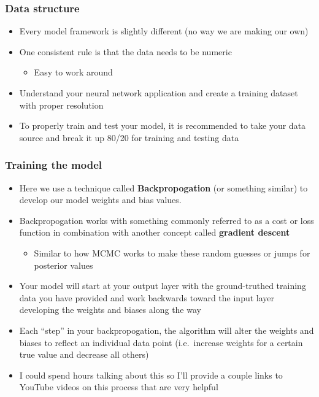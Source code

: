 \documentclass[
]{article}
\providecommand{\tightlist}{%
  \setlength{\itemsep}{0pt}\setlength{\parskip}{0pt}}
\begin{document}
\hypertarget{data-structure}{%
\subsubsection{Data structure}\label{data-structure}}

\begin{itemize}
\tightlist
\item
  Every model framework is slightly different (no way we are making our
  own)
\item
  One consistent rule is that the data needs to be numeric

  \begin{itemize}
  \tightlist
  \item
    Easy to work around
  \end{itemize}
\item
  Understand your neural network application and create a training
  dataset with proper resolution
\item
  To properly train and test your model, it is recommended to take your
  data source and break it up 80/20 for training and testing data
\end{itemize}

\hypertarget{training-the-model}{%
\subsubsection{Training the model}\label{training-the-model}}

\begin{itemize}
\tightlist
\item
  Here we use a technique called \textbf{Backpropogation} (or something
  similar) to develop our model weights and bias values.
\item
  Backpropogation works with something commonly referred to as a cost or
  loss function in combination with another concept called
  \textbf{gradient descent}

  \begin{itemize}
  \tightlist
  \item
    Similar to how MCMC works to make these random guesses or jumps for
    posterior values
  \end{itemize}
\item
  Your model will start at your output layer with the ground-truthed
  training data you have provided and work backwards toward the input
  layer developing the weights and biases along the way
\item
  Each ``step'' in your backpropogation, the algorithm will alter the
  weights and biases to reflect an individual data point (i.e.~increase
  weights for a certain true value and decrease all others)
\item
  I could spend hours talking about this so I'll provide a couple links
  to YouTube videos on this process that are very helpful
\end{itemize}
\end{document}
